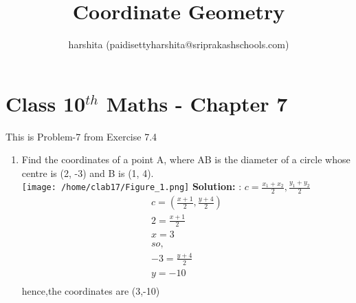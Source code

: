 \documentclass[12pt]{article}
\title{Coordinate Geometry}
\author{harshita (paidisettyharshita@sriprakashschools.com)}
\newcommand{\solution}{\noindent \textbf{Solution: }}
\begin{document}
\maketitle
\section*{Class 10$^{th}$ Maths - Chapter 7}
This is Problem-7 from Exercise 7.4
\begin{enumerate}
\item Find the coordinates of a point A, where AB is the diameter of a circle whose centre is (2, -3) and B is (1, 4).\\
\texttt{[image: /home/clab17/Figure\_1.png]}
\solution:
$c = \frac{x_1+x_2}{2} , \frac{y_1+y_2}{2}$\\
\begin{align}
c = (\frac{x+1}{2} , \frac{y+4}{2})\\
2 = \frac{x+1}{2} \\
x=3\\
so,\\
-3 =\frac{y+4}{2}\\
y=-10\\
\end{align}
hence,the coordinates are (3,-10)

\end{enumerate}
\end{document}

